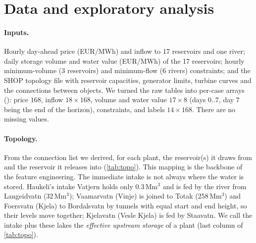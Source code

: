 \documentclass[11pt,a4paper]{article}
\newcommand{\code}[1]{\texttt{\detokenize{#1}}}
\begin{document}
\section{Data and exploratory analysis}
\paragraph{Inputs.} Hourly day-ahead price (EUR/MWh) and inflow to 17 reservoirs and one river; daily
storage volume and water value (EUR/MWh) of the 17 reservoirs; hourly minimum-volume (3 reservoirs) and
minimum-flow (6 rivers) constraints; and the SHOP topology file with reservoir capacities, generator limits,
turbine curves and the connections between objects. We turned the raw tables into per-case arrays
(\code{src/data.py}): price $168$, inflow $18\times168$, volume and water value $17\times8$ (days $0..7$,
day $7$ being the end of the horizon), constraints, and labels $14\times168$. There are no missing values.

\paragraph{Topology.} From the connection list we derived, for each plant, the reservoir(s) it draws from and
the reservoir it releases into (\cref{tab:topo}). This mapping is the backbone of the feature engineering.
The immediate intake is not always where the water is stored. Haukeli's intake Vatjern holds only
0.3\,Mm$^3$ and is fed by the river from Langeidvatn (32\,Mm$^3$); Vaamarvatn (Vinje) is joined to Totak
(258\,Mm$^3$) and Foersvatn (Kjela) to Bordalsvatn by tunnels with equal start and end height, so their levels
move together; Kjelavatn (Vesle Kjela) is fed by Staavatn. We call the intake plus these lakes the
\emph{effective upstream storage} of a plant (last column of \cref{tab:topo}).
\end{document}

